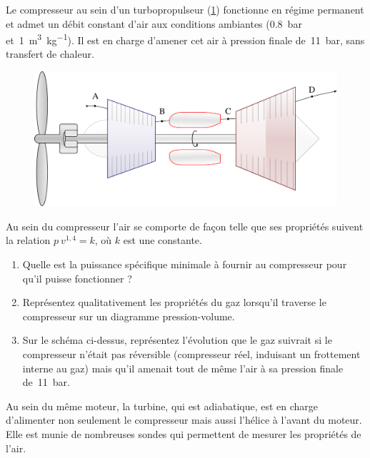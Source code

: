 	\wherefrom{[DS n°2 2012, 11 pts]}

	Le compresseur au sein d’un turbopropulseur (\cref{fig_turboprop}) fonctionne en régime permanent et admet un débit constant d’air aux conditions ambiantes (\SI{0,8}{\bar} et~\SI{1}{\metre\cubed\per\kilogram}). Il est en charge d’amener cet air à pression finale de~\SI{11}{\bar}, sans transfert de chaleur.
	
	\begin{figure}
		\begin{center}
			\includegraphics[width=12cm]{images/circuit_turboprop.png}
		\end{center}
		\label{fig_turboprop}
	\end{figure}

	
	Au sein du compresseur l’air se comporte de façon telle que ses propriétés suivent la relation $p \ v^{1,4} = k$, où $k$ est une constante.

	\begin{enumerate}
		\item Quelle est la puissance spécifique minimale à fournir au compresseur pour qu’il puisse fonctionner ?
		\item Représentez qualitativement les propriétés du gaz lorsqu’il traverse le compresseur sur un diagramme pression-volume.
		\item Sur le schéma ci-dessus, représentez l’évolution que le gaz suivrait si le compresseur n’était pas réversible (compresseur réel, induisant un frottement interne au gaz) mais qu’il amenait tout de même l’air à sa pression finale de~\SI{11}{\bar}.
	\end{enumerate}
	
	Au sein du même moteur, la turbine, qui est adiabatique, est en charge d’alimenter non seulement le compresseur mais aussi l’hélice à l’avant du moteur. Elle est munie de nombreuses sondes qui permettent de mesurer les propriétés de l’air.
	
